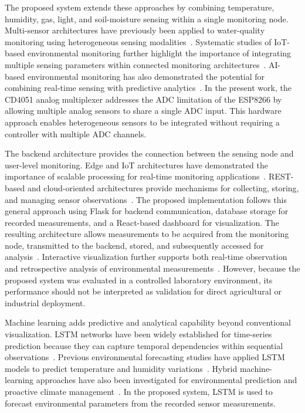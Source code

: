﻿\documentclass[journal]{IEEEtran}
\begin{document}
The proposed system extends these approaches by combining temperature,
humidity, gas, light, and soil-moisture sensing within a single monitoring
node. Multi-sensor architectures have previously been applied to water-quality
monitoring using heterogeneous sensing modalities~\cite{ref20}. Systematic
studies of IoT-based environmental monitoring further highlight the importance
of integrating multiple sensing parameters within connected monitoring
architectures~\cite{ref21}. AI-based environmental monitoring has also
demonstrated the potential for combining real-time sensing with predictive
analytics~\cite{ref22}. In the present work, the CD4051 analog multiplexer
addresses the ADC limitation of the ESP8266 by allowing multiple analog
sensors to share a single ADC input. This hardware approach enables
heterogeneous sensors to be integrated without requiring a controller with
multiple ADC channels.

The backend architecture provides the connection between the sensing node and
user-level monitoring. Edge and IoT architectures have demonstrated the
importance of scalable processing for real-time monitoring applications~\cite{ref23}.
REST-based and cloud-oriented architectures provide mechanisms for collecting,
storing, and managing sensor observations~\cite{ref24}. The proposed
implementation follows this general approach using Flask for backend
communication, database storage for recorded measurements, and a React-based
dashboard for visualization. The resulting architecture allows measurements
to be acquired from the monitoring node, transmitted to the backend, stored,
and subsequently accessed for analysis~\cite{ref25}. Interactive visualization
further supports both real-time observation and retrospective analysis of
environmental measurements~\cite{ref26}. However, because the proposed system
was evaluated in a controlled laboratory environment, its performance should
not be interpreted as validation for direct agricultural or industrial
deployment.

Machine learning adds predictive and analytical capability beyond conventional
visualization. LSTM networks have been widely established for time-series
prediction because they can capture temporal dependencies within sequential
observations~\cite{ref27}. Previous environmental forecasting studies have
applied LSTM models to predict temperature and humidity variations~\cite{ref28}.
Hybrid machine-learning approaches have also been investigated for
environmental prediction and proactive climate management~\cite{ref29}. In
the proposed system, LSTM is used to forecast environmental parameters from
the recorded sensor measurements.
\end{document}
